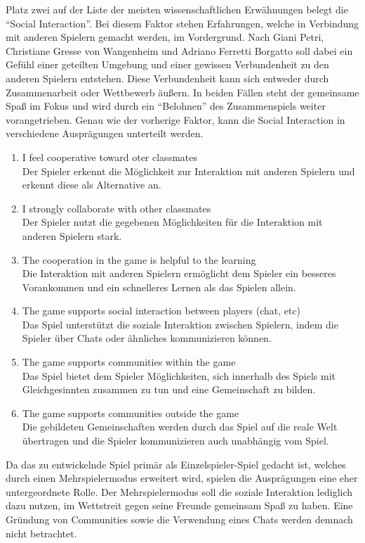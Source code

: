 	Platz zwei auf der Liste der meisten wissenschaftlichen Erwähnungen belegt die \enquote{Social Interaction}. Bei diesem Faktor stehen Erfahrungen, welche in Verbindung mit anderen Spielern gemacht werden, im Vordergrund. Nach Giani Petri, Christiane Gresse von Wangenheim und Adriano Ferretti Borgatto soll dabei ein Gefühl einer geteilten Umgebung und einer gewissen Verbundenheit zu den anderen Spielern entstehen. Diese Verbundenheit kann sich entweder durch Zusammenarbeit oder Wettbewerb äußern. In beiden Fällen steht der gemeinsame Spaß im Fokus und wird durch ein \enquote{Belohnen} des Zusammenspiels weiter vorangetrieben.
	Genau wie der vorherige Faktor, kann die Social Interaction in verschiedene Ausprägungen unterteilt werden.
	\begin{enumerate}
		\item{I feel cooperative toward oter classmates}\hfill \\
		Der Spieler erkennt die Möglichkeit zur Interaktion mit anderen Spielern und erkennt diese als Alternative an.
		\item{I strongly collaborate with other classmates}\hfill \\
		Der Spieler nutzt die gegebenen Möglichkeiten für die Interaktion mit anderen Spielern stark.
		\item{The cooperation in the game is helpful to the learning}\hfill \\
		Die Interaktion mit anderen Spielern ermöglicht dem Spieler ein besseres Vorankommen und ein schnelleres Lernen als das Spielen allein.
		\item{The game supports social interaction between players (chat, etc)}\hfill \\
		Das Spiel unterstützt die soziale Interaktion zwischen Spielern, indem die Spieler über Chats oder ähnliches kommunizieren können.
		\item{The game supports communities within the game}\hfill \\
		Das Spiel bietet dem Spieler Möglichkeiten, sich innerhalb des Spiels mit Gleichgesinnten zusammen zu tun und eine Gemeinschaft zu bilden.
		\item{The game supports communities outside the game}\hfill \\
		Die gebildeten Gemeinschaften werden durch das Spiel auf die reale Welt übertragen und die Spieler kommunizieren auch unabhängig vom Spiel.
	\end{enumerate}
	Da das zu entwickelnde Spiel primär als Einzelspieler-Spiel gedacht ist, welches durch einen Mehrspielermodus erweitert wird, spielen die Ausprägungen eine eher untergeordnete Rolle. Der Mehrspielermodus soll die soziale Interaktion lediglich dazu nutzen, im Wettstreit gegen seine Freunde gemeinsam Spaß zu haben. Eine Gründung von Communities sowie die Verwendung eines Chats werden demnach nicht betrachtet.

